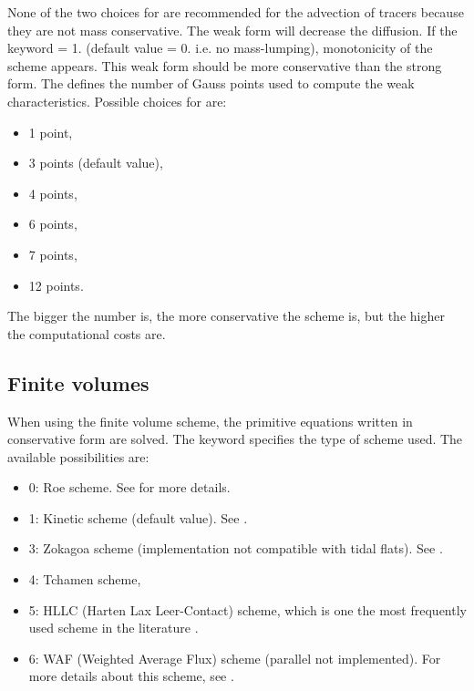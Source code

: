None of the two choices for 
are recommended for the advection of tracers because they are not
mass conservative. The weak form will decrease the diffusion. If the keyword
 = 1. (default value = 0. i.e. no
mass-lumping), monotonicity of the scheme appears. This weak form should be
more conservative than the strong form. The  defines the number of Gauss points used to compute the
weak characteristics.
Possible choices for  are:
\begin{itemize}
\item 1 point,
\item 3 points (default value),
\item 4 points,
\item 6 points,
\item 7 points,
\item 12 points.
\end{itemize}
The bigger the number is, the more conservative the scheme is, but the higher the
computational costs are.

\subsection{Finite volumes}
When using the finite volume scheme, the primitive equations written
in conservative form are solved.
The keyword  specifies the type of scheme used.
The available possibilities are:

\begin{itemize}
\item 0: Roe scheme. See \cite{roe1981approximate} for more details.

\item 1: Kinetic scheme (default value). See \cite{audusse2000kinetic}.

\item 3: Zokagoa scheme (implementation not compatible with tidal flats).
See \cite{zokagoa2010modeling}.

\item 4: Tchamen scheme, 

\item 5: HLLC (Harten Lax Leer-Contact) scheme,
which is one the most frequently used scheme in the literature 
\cite{toro2009hll}.

\item 6: WAF (Weighted Average Flux) scheme (parallel not implemented).
For more details about this scheme, see \cite{Ata2012}.
\end{itemize}

